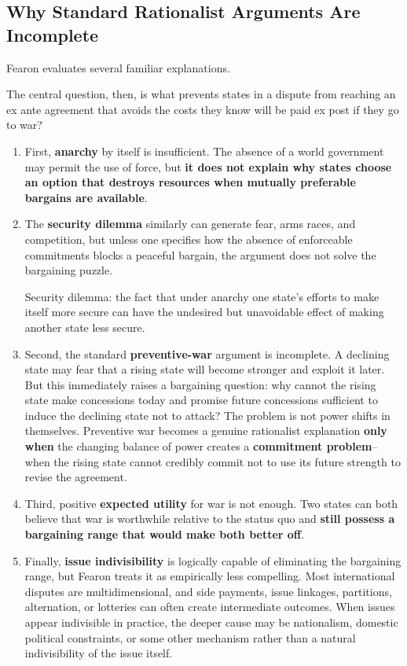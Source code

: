 \subsection{Why Standard Rationalist Arguments Are Incomplete}

Fearon evaluates several familiar explanations.

The central question, then, is what prevents states in a dispute from reaching an ex ante agreement that avoids the costs they know will be paid ex post if they go to war?

\begin{enumerate}
    \item First, \textbf{anarchy} by itself is insufficient. The absence of a world government may permit the use of force, but \textbf{it does not explain why states choose an option that destroys resources when mutually preferable bargains are available}.
    
    \item The \textbf{security dilemma} similarly can generate fear, arms races, and competition, but unless one specifies how the absence of enforceable commitments blocks a peaceful bargain, the argument does not solve the bargaining puzzle.
    
    Security dilemma: the fact that under anarchy one state's efforts to make itself more secure can have the undesired but unavoidable effect of making another state less secure.

    \item Second, the standard \textbf{preventive-war} argument is incomplete. A declining state may fear that a rising state will become stronger and exploit it later. But this immediately raises a bargaining question: why cannot the rising state make concessions today and promise future concessions sufficient to induce the declining state not to attack? The problem is not power shifts in themselves. Preventive war becomes a genuine rationalist explanation \textbf{only when} the changing balance of power creates a \textbf{commitment problem}--when the rising state cannot credibly commit not to use its future strength to revise the agreement.
    \item Third, positive \textbf{expected utility} for war is not enough. Two states can both believe that war is worthwhile relative to the status quo and \textbf{still possess a bargaining range that would make both better off}.
    \item Finally, \textbf{issue indivisibility} is logically capable of eliminating the bargaining range, but Fearon treats it as empirically less compelling. Most international disputes are multidimensional, and side payments, issue linkages, partitions, alternation, or lotteries can often create intermediate outcomes. When issues appear indivisible in practice, the deeper cause may be nationalism, domestic political constraints, or some other mechanism rather than a natural indivisibility of the issue itself.
\end{enumerate}

